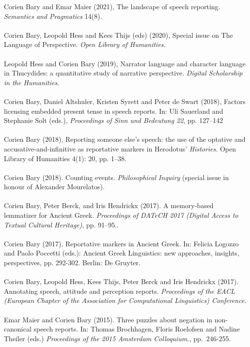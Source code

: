 \documentclass[a4paper,11pt]{article}
\begin{document}
Corien Bary and Emar Maier (2021), The landscape of speech reporting. \emph{Semantics and Pragmatics} 14(8).\\\\
Corien Bary, Leopold Hess and Kees Thijs (eds) (2020), Special issue on The Language of Perspective. \emph{Open Library of Humanities}.\\\\
Leopold Hess and Corien Bary (2019), Narrator language and character language in Thucydides: a quantitative study of narrative perspective. \emph{Digital Scholarship in the Humanities}.\\\\
Corien Bary, Daniel Altshuler, Kristen Syrett and Peter de Swart (2018), Factors licensing embedded present tense in speech reports. In: Uli Sauerland and Stephanie Solt (eds.), \emph{Proceedings of Sinn und Bedeutung 22}, pp. 127--142\\\\
Corien Bary (2018), Reporting someone else's speech: the use of the optative and accusative-and-infinitive as reportative markers in Herodotus' \emph{Histories}. Open Library of Humanities 4(1): 20, pp. 1--38.\\\\
Corien Bary (2018). Counting events. \emph{Philosophical Inquiry} (special issue in honour of Alexander Mourelatos).\\\\
Corien Bary, Peter Berck, and Iris Hendrickx (2017). A memory-based lemmatizer for Ancient Greek. \emph{Proceedings of DATeCH 2017 (Digital Access to Textual Cultural Heritage)}, pp. 91--95..\\\\
Corien Bary (2017). Reportative markers in Ancient Greek. In: Felicia Logozzo and Paolo Poccetti (eds.): Ancient Greek Linguistics: new approaches, insights, perspectives, pp. 292-302. Berlin: De Gruyter.\\\\
Corien Bary, Leopold Hess, Kees Thijs, Peter Berck and Iris Hendrickx (2017). Annotating speech, attitude and perception reports. \emph{Proceedings of the EACL  (European Chapter of the Association for Computational Linguistics) Conference}.\\\\
Emar Maier and Corien Bary (2015). Three puzzles about negation in non-canonical speech reports. In: Thomas Brochhagen, Floris Roelofsen and Nadine Theiler (eds.) \emph{Proceedings of the 2015 Amsterdam Colloquium.}, pp.\ 246-255.\\\\
\end{document}
